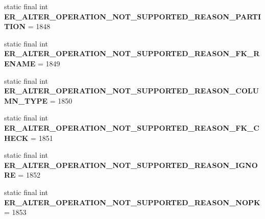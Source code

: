 \begin{DoxyCompactItemize}
\mbox{\label{classcom_1_1mysql_1_1jdbc_1_1_mysql_error_numbers_a28ee58bfaca366bd72996d9eaaaa2024}} 
static final int {\bfseries E\+R\+\_\+\+A\+L\+T\+E\+R\+\_\+\+O\+P\+E\+R\+A\+T\+I\+O\+N\+\_\+\+N\+O\+T\+\_\+\+S\+U\+P\+P\+O\+R\+T\+E\+D\+\_\+\+R\+E\+A\+S\+O\+N\+\_\+\+P\+A\+R\+T\+I\+T\+I\+ON} = 1848
\item 
\mbox{\label{classcom_1_1mysql_1_1jdbc_1_1_mysql_error_numbers_aef04debfd473644a573b5a2ed28220b7}} 
static final int {\bfseries E\+R\+\_\+\+A\+L\+T\+E\+R\+\_\+\+O\+P\+E\+R\+A\+T\+I\+O\+N\+\_\+\+N\+O\+T\+\_\+\+S\+U\+P\+P\+O\+R\+T\+E\+D\+\_\+\+R\+E\+A\+S\+O\+N\+\_\+\+F\+K\+\_\+\+R\+E\+N\+A\+ME} = 1849
\item 
\mbox{\label{classcom_1_1mysql_1_1jdbc_1_1_mysql_error_numbers_aa0a8a7fa6af04da60845da08bc81ccb6}} 
static final int {\bfseries E\+R\+\_\+\+A\+L\+T\+E\+R\+\_\+\+O\+P\+E\+R\+A\+T\+I\+O\+N\+\_\+\+N\+O\+T\+\_\+\+S\+U\+P\+P\+O\+R\+T\+E\+D\+\_\+\+R\+E\+A\+S\+O\+N\+\_\+\+C\+O\+L\+U\+M\+N\+\_\+\+T\+Y\+PE} = 1850
\item 
\mbox{\label{classcom_1_1mysql_1_1jdbc_1_1_mysql_error_numbers_a5ecc6c55fb0c3051d87ef4a20073a7e2}} 
static final int {\bfseries E\+R\+\_\+\+A\+L\+T\+E\+R\+\_\+\+O\+P\+E\+R\+A\+T\+I\+O\+N\+\_\+\+N\+O\+T\+\_\+\+S\+U\+P\+P\+O\+R\+T\+E\+D\+\_\+\+R\+E\+A\+S\+O\+N\+\_\+\+F\+K\+\_\+\+C\+H\+E\+CK} = 1851
\item 
\mbox{\label{classcom_1_1mysql_1_1jdbc_1_1_mysql_error_numbers_ae73ec5938080eeb11654f6fefcf16f02}} 
static final int {\bfseries E\+R\+\_\+\+A\+L\+T\+E\+R\+\_\+\+O\+P\+E\+R\+A\+T\+I\+O\+N\+\_\+\+N\+O\+T\+\_\+\+S\+U\+P\+P\+O\+R\+T\+E\+D\+\_\+\+R\+E\+A\+S\+O\+N\+\_\+\+I\+G\+N\+O\+RE} = 1852
\item 
\mbox{\label{classcom_1_1mysql_1_1jdbc_1_1_mysql_error_numbers_a4907a435edadbb5b9879f3008d15e162}} 
static final int {\bfseries E\+R\+\_\+\+A\+L\+T\+E\+R\+\_\+\+O\+P\+E\+R\+A\+T\+I\+O\+N\+\_\+\+N\+O\+T\+\_\+\+S\+U\+P\+P\+O\+R\+T\+E\+D\+\_\+\+R\+E\+A\+S\+O\+N\+\_\+\+N\+O\+PK} = 1853
\item 

\end{DoxyCompactItemize}
